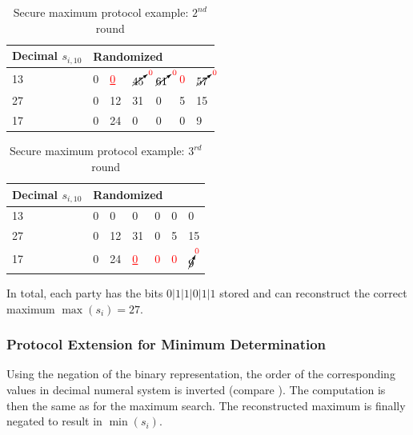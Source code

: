 \begin{table}[!htb]
	\centering
	\caption{Secure maximum protocol example: $2^{nd}$ round} \label{table:secure maximum p1 not maximum}
	\begin{tabular}{|l|l|l|l|l|l|l|}
		\hline
		Decimal $s_{i,10}$ & \multicolumn{6}{l|}{Randomized} \\ \hline
		13                 & 0    & \textcolor{red}{\underline{0}}    & $\cancelto{\textcolor{red}{0}}{45}$    & $\cancelto{\textcolor{red}{0}}{61}$    & \textcolor{red}{0}   & $\cancelto{\textcolor{red}{0}}{57}$   \\ \hline
		27                 & 0    & 12    & 31    & 0    & 5   & 15   \\ \hline
		17                 & 0    & 24    & 0    & 0    & 0   & 9   \\ \hline
	\end{tabular}
\end{table}

\begin{table}[!htb]
	\centering
	\caption{Secure maximum protocol example: $3^{rd}$ round} \label{table:secure maximum p3 not maximum}
	\begin{tabular}{|l|l|l|l|l|l|l|}
		\hline
		Decimal $s_{i,10}$ & \multicolumn{6}{l|}{Randomized} \\ \hline
		13                 & 0    & 0    & 0    & 0    & 0   & 0   \\ \hline
		27                 & 0    & 12    & 31    & 0    & 5   & 15   \\ \hline
		17                 & 0    & 24    & \textcolor{red}{\underline{0}}    & \textcolor{red}{0}    & \textcolor{red}{0}   & $\cancelto{\textcolor{red}{0}}{9}$   \\ \hline
	\end{tabular}
\end{table}

In total, each party has the bits $0|1|1|0|1|1$ stored and can reconstruct the correct maximum $\max(s_i)=27$.

\subsubsection{Protocol Extension for Minimum Determination} \label{Protocol Extension for Minimum Determination}

Using the negation of the binary representation, the order of the corresponding values in decimal numeral system is inverted (compare ). The computation is then the same as for the maximum search. The reconstructed maximum is finally negated to result in $\min(s_i)$.

